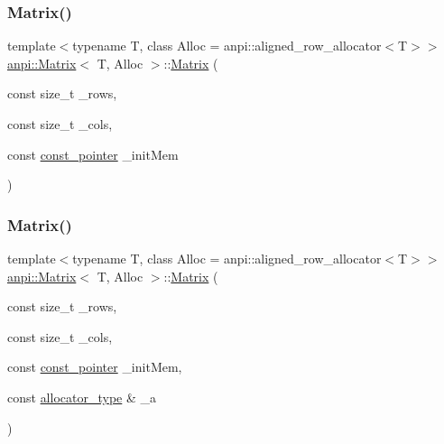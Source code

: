 \mbox{\label{classanpi_1_1Matrix_a5a61678fa5bcf2b7a81bd5400b9dfe8a}} 
\subsubsection{\texorpdfstring{Matrix()}{Matrix()}\hspace{0.1cm}{\footnotesize\ttfamily [7/17]}}
{\footnotesize\ttfamily template$<$typename T, class Alloc = anpi\+::aligned\+\_\+row\+\_\+allocator$<$\+T$>$$>$ \\
\hyperlink{classanpi_1_1Matrix}{anpi\+::\+Matrix}$<$ T, Alloc $>$\+::\hyperlink{classanpi_1_1Matrix}{Matrix} (\begin{DoxyParamCaption}\item[{const size\+\_\+t}]{\+\_\+rows,  }\item[{const size\+\_\+t}]{\+\_\+cols,  }\item[{const \hyperlink{classanpi_1_1Matrix_ac6d45526407ea4455424debdc4f21b91}{const\+\_\+pointer}}]{\+\_\+init\+Mem }\end{DoxyParamCaption})\hspace{0.3cm}{\ttfamily [explicit]}}

\mbox{\label{classanpi_1_1Matrix_acf7b5988a7b8ccab1ae40214ab7d5ab5}} 
\subsubsection{\texorpdfstring{Matrix()}{Matrix()}\hspace{0.1cm}{\footnotesize\ttfamily [8/17]}}
{\footnotesize\ttfamily template$<$typename T, class Alloc = anpi\+::aligned\+\_\+row\+\_\+allocator$<$\+T$>$$>$ \\
\hyperlink{classanpi_1_1Matrix}{anpi\+::\+Matrix}$<$ T, Alloc $>$\+::\hyperlink{classanpi_1_1Matrix}{Matrix} (\begin{DoxyParamCaption}\item[{const size\+\_\+t}]{\+\_\+rows,  }\item[{const size\+\_\+t}]{\+\_\+cols,  }\item[{const \hyperlink{classanpi_1_1Matrix_ac6d45526407ea4455424debdc4f21b91}{const\+\_\+pointer}}]{\+\_\+init\+Mem,  }\item[{const \hyperlink{classanpi_1_1Matrix_a3574b7528e3ddfb2f7cdf446be8286c1}{allocator\+\_\+type} \&}]{\+\_\+a }\end{DoxyParamCaption})\hspace{0.3cm}{\ttfamily [explicit]}}

